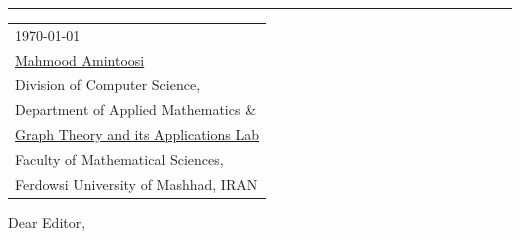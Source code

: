 \documentclass[10pt]{article}
\begin{document}


\vspace{-1em} %

\rule{\linewidth}{1pt} %

\bigskip\bigskip %


\hfill
\begin{tabular}{l @{}}
	\today \bigskip\\ %
\href{https://mamintoosi.github.io/}{Mahmood Amintoosi}\\
Division of Computer Science,\\
Department of Applied Mathematics \&\\
\href{https://gta-lab.github.io/}{Graph Theory and its Applications Lab} \\
Faculty of Mathematical Sciences,\\ Ferdowsi University of Mashhad,
IRAN
\end{tabular}




\bigskip %

Dear Editor,

\bigskip %
\end{document}
